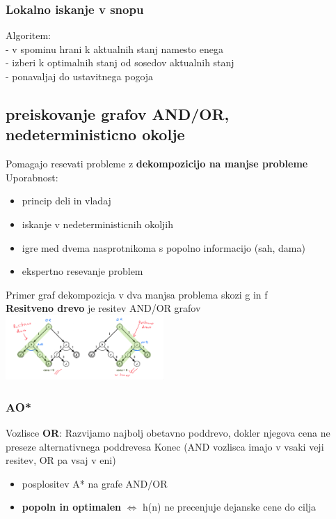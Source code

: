 \subsubsection{Lokalno iskanje v snopu}
Algoritem:\\
- v spominu hrani k aktualnih stanj namesto enega\\
- izberi k optimalnih stanj od sosedov aktualnih stanj\\
- ponavaljaj do ustavitnega pogoja 

\subsection{preiskovanje grafov AND/OR, nedeterministicno okolje}
Pomagajo resevati probleme z \textbf{dekompozicijo na manjse probleme}
Uporabnost:
\begin{itemize}[noitemsep,topsep=0pt,leftmargin=*]
    \item princip deli in vladaj
    \item iskanje v nedeterministicnih okoljih 
    \item igre med dvema nasprotnikoma s popolno informacijo (sah, dama)
    \item ekspertno resevanje problem
\end{itemize}
Primer graf dekompozicja v dva manjsa problema skozi g in f\\
\textbf{Resitveno drevo} je resitev AND/OR grafov\\
\includegraphics[width=6cm]{./images/resitveno-drevo.png}
\subsubsection{AO*}
Vozlisce \textbf{OR}: Razvijamo najbolj obetavno poddrevo, dokler njegova cena ne preseze alternativnega poddrevesa
Konec (AND vozlisca imajo v vsaki veji resitev, OR pa vsaj v eni)

\begin{itemize}[noitemsep,topsep=0pt,leftmargin=*]
    \item posplositev A* na grafe AND/OR
    \item \textbf{popoln in optimalen} $\Leftrightarrow$ h(n) ne precenjuje dejanske cene do cilja
\end{itemize}

